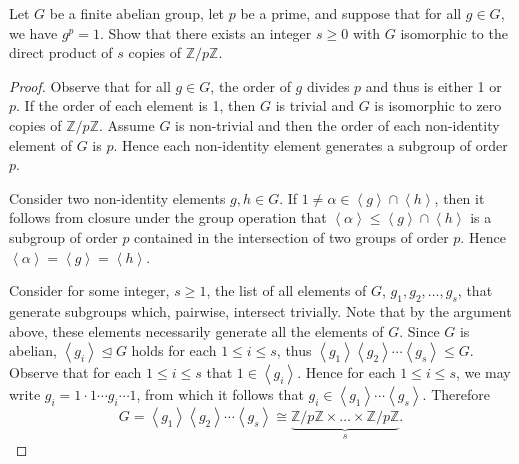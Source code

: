 \documentclass[10pt]{amsart}
\begin{document}
\begin{thm}
  Let $G$ be a finite abelian group, let $p$ be a prime, and suppose that for all $g \in G$, we have $g^p = 1$.
  Show that there exists an integer $s \geq 0$ with $G$ isomorphic to the direct product of $s$ copies of $\mathbb{Z}/p\mathbb{Z}$.
  \begin{proof}
    Observe that for all $g \in G$, the order of $g$ divides $p$ and thus is either 1 or $p$.
    If the order of each element is 1, then $G$ is trivial and $G$ is isomorphic to zero copies of $\mathbb{Z}/p\mathbb{Z}$.
    Assume $G$ is non-trivial and then the order of each non-identity element of $G$ is $p$.
    Hence each non-identity element generates a subgroup of order $p$.
    
    Consider two non-identity elements $g,h \in G$.
    If $1 \not = \alpha \in \left<g\right> \cap \left<h\right>$, then it follows from closure under the group operation that $\left<\alpha\right> \leq \left<g\right> \cap \left<h\right>$ is a subgroup of order $p$ contained in the intersection of two groups of order $p$.
    Hence $\left<\alpha\right> = \left<g\right> = \left<h\right>$.
    
    Consider for some integer, $s \geq 1$, the list of all elements of $G$, $g_1, g_2, \ldots, g_s$, that generate subgroups which, pairwise, intersect trivially.
    Note that by the argument above, these elements necessarily generate all the elements of $G$.
    Since $G$ is abelian, $\left<g_i\right> \unlhd G$ holds for each $1 \leq i \leq s$, thus $\left< g_1 \right>\left< g_2 \right> \cdots \left< g_s \right> \leq G$.
    Observe that for each $1 \leq i \leq s$ that $1 \in \left<g_i\right>$.
    Hence for each $1 \leq i \leq s$, we may write $g_i = 1 \cdot 1 \cdots g_i \cdots 1$, from which it follows that $g_i \in \left< g_1 \right> \cdots \left< g_s \right>$.
    Therefore $$G =  \left< g_1 \right> \left< g_2 \right> \cdots \left< g_s \right> \cong \underbrace{\mathbb{Z}/p\mathbb{Z} \times \ldots \times \mathbb{Z}/p\mathbb{Z}}_s.$$
  \end{proof}
\end{thm}
\end{document}
